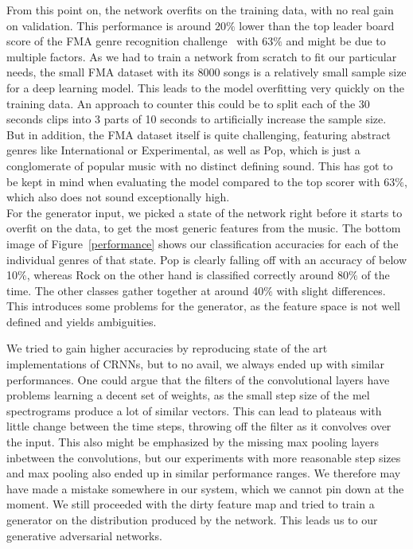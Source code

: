     From this point on, the network overfits on the training data, with no real gain on validation.
    This performance is around $20\%$ lower than the top leader board score of the FMA genre recognition challenge~\cite{GenreChallenge} with 63$\%$ and might be due to multiple factors.
    As we had to train a network from scratch to fit our particular needs, the small FMA dataset with its 8000 songs is a relatively small sample size for a deep learning model.
    This leads to the model overfitting very quickly on the training data.
    An approach to counter this could be to split each of the 30 seconds clips into 3 parts of 10 seconds to artificially increase the sample size.
    But in addition, the FMA dataset itself is quite challenging, featuring abstract genres like International or Experimental, as well as Pop, which is just a conglomerate of popular music with no distinct defining sound.
    This has got to be kept in mind when evaluating the model compared to the top scorer with 63$\%$, which also does not sound exceptionally high.\\
    For the generator input, we picked a state of the network right before it starts to overfit on the data, to get the most generic features from the music.
    The bottom image of Figure~\ref{performance} shows our classification accuracies for each of the individual genres of that state.
    Pop is clearly falling off with an accuracy of below 10$\%$, whereas Rock on the other hand is classified correctly around 80$\%$ of the time.
    The other classes gather together at around 40$\%$ with slight differences.
    This introduces some problems for the generator, as the feature space is not well defined and yields ambiguities.

    We tried to gain higher accuracies by reproducing state of the art implementations of CRNNs, but to no avail, we always ended up with similar performances.
    One could argue that the filters of the convolutional layers have problems learning a decent set of weights, as the small step size of the mel spectrograms produce a lot of similar vectors.
    This can lead to plateaus with little change between the time steps, throwing off the filter as it convolves over the input.
    This also might be emphasized by the missing max pooling layers inbetween the convolutions, but our experiments with more reasonable step sizes and max pooling also ended up in similar performance ranges.
    We therefore may have made a mistake somewhere in our system, which we cannot pin down at the moment.
    We still proceeded with the dirty feature map and tried to train a generator on the distribution produced by the network. This leads us to our generative adversarial networks.
